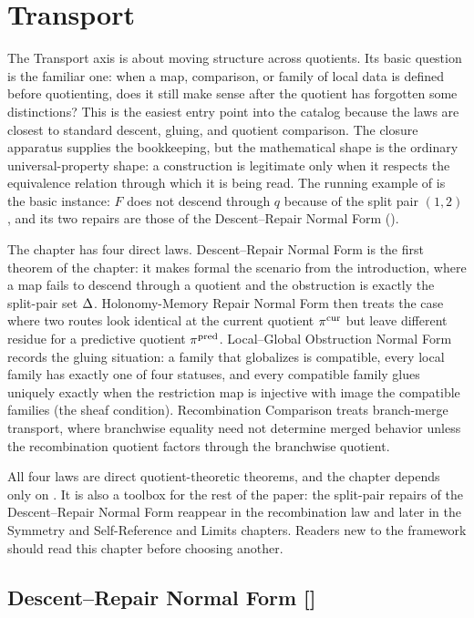 \section{Transport}\label{sec:transport}

The Transport axis is about moving structure across quotients.  Its
basic question is the familiar one: when a map, comparison, or family
of local data is defined before quotienting, does it still make sense
after the quotient has forgotten some distinctions?  This is the
easiest entry point into the catalog because the laws are closest to
standard descent, gluing, and quotient comparison.  The closure
apparatus supplies the bookkeeping, but the mathematical shape is the
ordinary universal-property shape: a construction is legitimate only
when it respects the equivalence relation through which it is being
read.  The running example of  is the basic instance:
\(F\) does not descend through \(q\) because of the split pair
\((1,2)\), and its two repairs are those of the Descent--Repair Normal
Form ().

The chapter has four direct laws.  Descent--Repair Normal Form is
the first theorem of the chapter: it makes formal the scenario from the
introduction, where a
map fails to descend through a quotient and the obstruction is exactly
the split-pair set \(\Delta\).  Holonomy-Memory Repair Normal Form
then treats the case where two routes look identical at the current
quotient \(\pi^{\mathrm{cur}}\) but leave different residue for a predictive
quotient \(\pi^{\mathrm{pred}}\).  Local--Global Obstruction Normal Form records
the gluing situation: a family that globalizes is compatible, every local
family has exactly one of four statuses, and every compatible family glues
uniquely exactly when the restriction map is injective with image the
compatible families (the sheaf condition).  Recombination
Comparison treats branch-merge transport, where branchwise equality
need not determine merged behavior unless the recombination quotient
factors through the branchwise quotient.

All four laws are direct quotient-theoretic theorems, and the chapter
depends only on .  It is also a toolbox for the
rest of the paper: the split-pair repairs of the Descent--Repair Normal
Form reappear in the recombination law and later in the Symmetry and
Self-Reference and Limits chapters.  Readers new to the framework
should read this chapter before choosing another.

\subsection{Descent--Repair Normal Form [\texorpdfstring{}{F2}]}\label{sec:transport:descent-repair}

